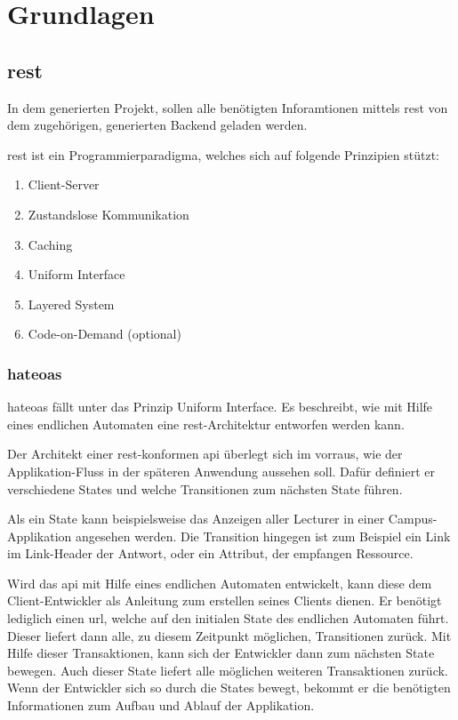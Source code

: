 \chapter{Grundlagen}\label{ch:basics}
\section{\acf{rest}}\label{sec:rest}
In dem generierten Projekt, sollen alle benötigten Inforamtionen mittels \ac{rest} von dem zugehörigen, generierten Backend geladen werden. 

\ac{rest} \cite{rest_fielding} ist ein Programmierparadigma, welches sich auf folgende Prinzipien stützt:


\begin{enumerate}
	\item  Client-Server
	\item  Zustandslose Kommunikation
	\item  Caching
	\item  Uniform Interface
	\item  Layered System
	\item  Code-on-Demand (optional)
\end{enumerate}

\subsection{\acf{hateoas}}\label{sec:hateoas}
\ac{hateoas} fällt unter das Prinzip Uniform Interface. Es beschreibt, wie mit Hilfe eines endlichen Automaten eine \ac{rest}-Architektur entworfen werden kann.

Der Architekt einer \ac{rest}-konformen \acf{api} überlegt sich im vorraus, wie der Applikation-Fluss in der späteren Anwendung aussehen soll. Dafür definiert er verschiedene States und welche Transitionen zum nächsten State führen.

Als ein State kann beispielsweise das Anzeigen aller Lecturer in einer Campus-Applikation angesehen werden.
Die Transition hingegen ist zum Beispiel ein Link im Link-Header der Antwort, oder ein Attribut, der empfangen Ressource. 

Wird das \ac{api} mit Hilfe eines endlichen Automaten entwickelt, kann diese dem Client-Entwickler als Anleitung zum erstellen seines Clients dienen. Er benötigt lediglich einen \acf{url}, welche auf den initialen State des endlichen Automaten führt. Dieser liefert dann alle, zu diesem Zeitpunkt möglichen, Transitionen zurück. Mit Hilfe dieser Transaktionen, kann sich der Entwickler dann zum nächsten State bewegen. Auch dieser State liefert alle möglichen weiteren Transaktionen zurück. 
Wenn der Entwickler sich so durch die States bewegt, bekommt er die benötigten Informationen zum Aufbau und Ablauf der Applikation.

